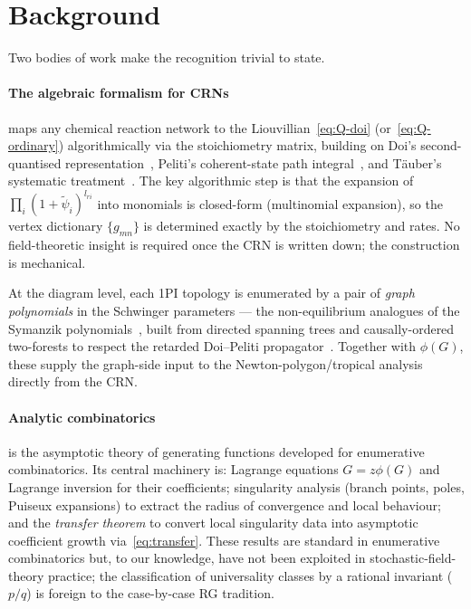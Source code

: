 \documentclass[11pt,a4paper]{article}
\newcommand{\psit}{\tilde\psi}
\theoremstyle{plain}
\theoremstyle{definition}
\begin{document}
\section{Background}
\label{sec:background}

Two bodies of work make the recognition trivial to state.

\paragraph{The algebraic formalism for CRNs}
\citep{Amarteifio2019Thesis} maps any chemical reaction network
to the Liouvillian~\eqref{eq:Q-doi} (or~\eqref{eq:Q-ordinary})
algorithmically via the stoichiometry matrix, building on Doi's
second-quantised representation~\citep{Doi1976}, Peliti's
coherent-state path integral~\citep{Peliti1985}, and T\"auber's
systematic treatment~\citep{Tauber}.  The key algorithmic step is
that the expansion of $\prod_i (1 + \psit_i)^{l_{r i}}$ into
monomials is closed-form (multinomial expansion), so the vertex
dictionary $\{g_{m n}\}$ is determined exactly by the
stoichiometry and rates.  No field-theoretic insight is required
once the CRN is written down; the construction is mechanical.

At the diagram level, each 1PI topology is enumerated by a pair of
\emph{graph polynomials} in the Schwinger parameters --- the
non-equilibrium analogues of the Symanzik
polynomials~\citep{BognerWeinzierl}, built from directed spanning
trees and causally-ordered two-forests to respect the retarded
Doi--Peliti propagator~\citep{Amarteifio2019Thesis}.  Together with
$\phi(G)$, these supply the graph-side input to the
Newton-polygon/tropical analysis directly from the CRN.

\paragraph{Analytic combinatorics}
\citep{FlajoletSedgewick} is the asymptotic theory of generating
functions developed for enumerative combinatorics.  Its central
machinery is: Lagrange equations $G = z\phi(G)$ and Lagrange
inversion for their coefficients; singularity analysis (branch
points, poles, Puiseux expansions) to extract the radius of
convergence and local behaviour; and the \emph{transfer theorem}
to convert local singularity data into asymptotic coefficient
growth via~\eqref{eq:transfer}.  These results are standard in
enumerative combinatorics but, to our knowledge, have not been
exploited in stochastic-field-theory practice; the classification
of universality classes by a rational invariant ($p/q$) is foreign
to the case-by-case RG tradition.
\end{document}

